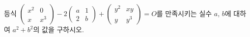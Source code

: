 등식 $\begin{pmatrix} x^2 & 0 \\ x & x^3 \end{pmatrix}-2\begin{pmatrix} a & 1 \\ 2 & b \end{pmatrix}+\begin{pmatrix} y^2 & xy \\ y & y^3 \end{pmatrix}=O$를 만족시키는 실수 $a$, $b$에 대하여 $a^2+b^2$의 값을 구하시오. 

